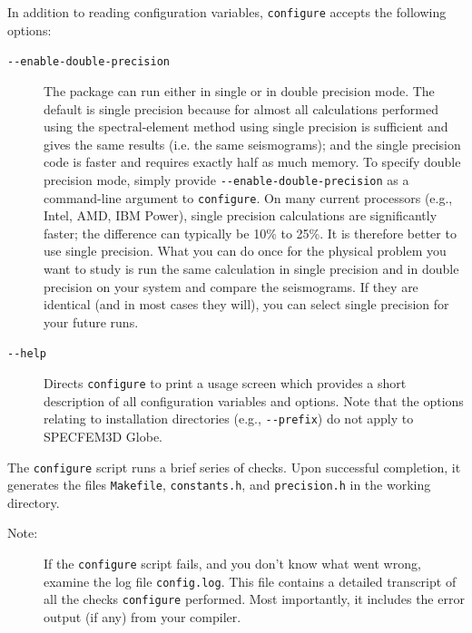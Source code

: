 In addition to reading configuration variables, \texttt{configure}
accepts the following options:

\begin{description}
\item [{\texttt{-{}-enable-double-precision}}] The package can run either
in single or in double precision mode. The default is single precision
because for almost all calculations performed using the spectral-element method
using single precision is sufficient and gives the same results (i.e. the same seismograms);
and the single precision code is faster and requires exactly half as much memory. To specify
double precision mode, simply provide \texttt{-{}-enable-double-precision}
as a command-line argument to \texttt{configure}.
On many current processors (e.g., Intel, AMD, IBM Power), single precision calculations
are significantly faster; the difference can typically be 10\%
to 25\%. It is therefore better to use single precision.
What you can do once for the physical problem you want to study is run the same calculation in single precision
and in double precision on your system and compare the seismograms.
If they are identical (and in most cases they will), you can select single precision for your future runs.

\item [{\texttt{-{}-help}}] Directs \texttt{configure} to print a usage
screen which provides a short description of all configuration variables
and options. Note that the options relating to installation directories
(e.g., \texttt{-{}-prefix}) do not apply to SPECFEM3D Globe.
\end{description}

The \texttt{configure} script runs a brief series of checks. Upon
successful completion, it generates the files \texttt{Makefile}, \texttt{constants.h},
and \texttt{precision.h} in the working directory.

\begin{description}
\item [{Note:}] If the \texttt{configure} script fails, and you don't know
what went wrong, examine the log file \texttt{config.log}. This file
contains a detailed transcript of all the checks \texttt{configure}
performed. Most importantly, it includes the error output (if any)
from your compiler.
\end{description}

